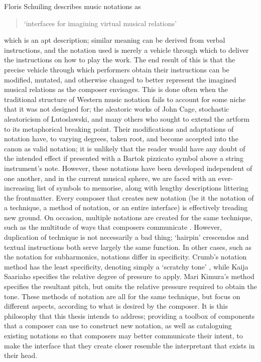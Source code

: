 Floris Schuiling describes music notations as \begin{quotation}
`interfaces for imagining virtual musical relations'
\end{quotation}
which is an apt description; similar meaning can be derived from verbal instructions, and the notation used is merely a vehicle through which to deliver the instructions on how to play the work.
The end result of this is that the precise vehicle through which performers obtain their instructions can be modified, mutated, and otherwise changed to better represent the imagined musical relations as the composer envisages.
This is done often when the traditional structure of Western music notation fails to account for some niche that it was not designed for; the aleatoric works of John Cage, stochastic aleatoricism of Lutoslawski, and many others who sought to extend the artform to its metaphorical breaking point.
Their modifications and adaptations of notation have, to varying degrees, taken root, and become accepted into the canon as valid notation; it is unlikely that the reader would have any doubt of the intended effect if presented with a Bartok pizzicato symbol above a string instrument's note.
However, these notations have been developed independent of one another, and in the current musical sphere, we are faced with an ever-increasing list of symbols to memorise, along with lengthy descriptions littering the frontmatter.
Every composer that creates new notation (be it the notation of a technique, a method of notation, or an entire interface) is effectively treading new ground.
On occasion, multiple notations are created for the same technique, such as the multitude of ways that composers communicate .
However, duplication of technique is not necessarily a bad thing; `hairpin' crescendos and textual instructions both serve largely the same function.
In other cases, such as the notation for  subharmonics, notations differ in specificity. 
Crumb's notation method has the least specificity, denoting simply a `scratchy tone' , while Kaija Saariaho specifies the relative degree of pressure to apply.
Mari Kimura's method specifies the resultant pitch, but omits the relative pressure required to obtain the tone.
These methods of notation are all for the same technique, but focus on different aspects, according to what is desired by the composer.
It is this philosophy that this thesis intends to address; 
providing a toolbox of components that a composer can use to construct new notation, as well as cataloguing existing notations so that composers may better communicate their intent, to make the interface that they create closer resemble the interpretant that exists in their head.

